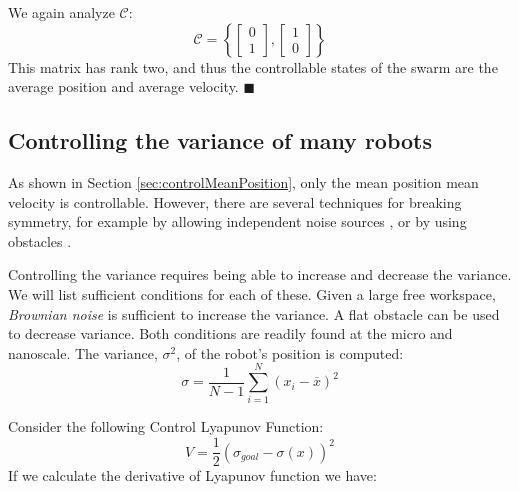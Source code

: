 We again analyze $\mathcal{C}$:
\begin{equation}
\mathcal{C}=\left\{ \begin{bmatrix} 
0\\
1
\end{bmatrix}
,
 \begin{bmatrix} 
1\\
0
\end{bmatrix}
 \right\}
\end{equation}
This matrix has rank two, and thus the controllable states of the swarm are the average position and average velocity.
$\blacksquare$ 

\subsection{Controlling the variance of many robots}\label{sec:VarianceControl}

As shown in Section \ref{sec:controlMeanPosition}, only the mean position mean velocity is controllable. However, there are several techniques for breaking symmetry, for example by allowing independent noise sources \cite{beckerIJRR2014}, or by using obstacles \cite{Becker2013b}.

Controlling the variance requires being able to increase and decrease the variance.  We will list sufficient conditions for each of these.  Given a large free workspace, \emph{Brownian noise} is sufficient to increase the variance.   A flat obstacle can be used to decrease variance. Both conditions are readily found at the micro and nanoscale. The variance, $\sigma^2$, of the robot's position is computed:
\begin{equation}
\sigma = \frac{1}{N-1} \sum_{i=1}^N (x_i - \overline{x})^2
\end{equation}

Consider the following Control Lyapunov Function:
\begin{equation}
V = \frac{1}{2} (\sigma_{goal} - \sigma(x))^2
\end{equation}
If we calculate the derivative of Lyapunov function we have:


